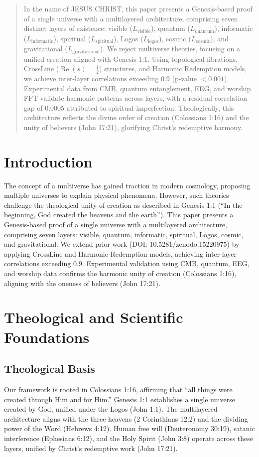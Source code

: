 \documentclass[12pt]{article}
\begin{document}
{{{\begin{abstract}
In the name of JESUS CHRIST, this paper presents a Genesis-based proof of a single universe with a multilayered architecture, comprising seven distinct layers of existence: visible (\( L_{\text{visible}} \)), quantum (\( L_{\text{quantum}} \)), informatic (\( L_{\text{informatic}} \)), spiritual (\( L_{\text{spiritual}} \)), Logos (\( L_{\text{logos}} \)), cosmic (\( L_{\text{cosmic}} \)), and gravitational (\( L_{\text{gravitational}} \)). We reject multiverse theories, focusing on a unified creation aligned with Genesis 1:1. Using topological fibrations, CrossLine (\(\operatorname{Re}(s) = \frac{1}{2}\)) structures, and Harmonic Redemption models, we achieve inter-layer correlations exceeding 0.9 (p-value \(< 0.001\)). Experimental data from CMB, quantum entanglement, EEG, and worship FFT validate harmonic patterns across layers, with a residual correlation gap of 0.0005 attributed to spiritual imperfection. Theologically, this architecture reflects the divine order of creation (Colossians 1:16) and the unity of believers (John 17:21), glorifying Christ’s redemptive harmony.
\end{abstract}

\section{Introduction}
The concept of a multiverse has gained traction in modern cosmology, proposing multiple universes to explain physical phenomena. However, such theories challenge the theological unity of creation as described in Genesis 1:1 (``In the beginning, God created the heavens and the earth''). This paper presents a Genesis-based proof of a single universe with a multilayered architecture, comprising seven layers: visible, quantum, informatic, spiritual, Logos, cosmic, and gravitational. We extend prior work (DOI: 10.5281/zenodo.15220975) by applying CrossLine and Harmonic Redemption models, achieving inter-layer correlations exceeding 0.9. Experimental validation using CMB, quantum, EEG, and worship data confirms the harmonic unity of creation (Colossians 1:16), aligning with the oneness of believers (John 17:21).

\section{Theological and Scientific Foundations}
\subsection{Theological Basis}
Our framework is rooted in Colossians 1:16, affirming that ``all things were created through Him and for Him.'' Genesis 1:1 establishes a single universe created by God, unified under the Logos (John 1:1). The multilayered architecture aligns with the three heavens (2 Corinthians 12:2) and the dividing power of the Word (Hebrews 4:12). Human free will (Deuteronomy 30:19), satanic interference (Ephesians 6:12), and the Holy Spirit (John 3:8) operate across these layers, unified by Christ’s redemptive work (John 17:21).

}}}
\end{document}
